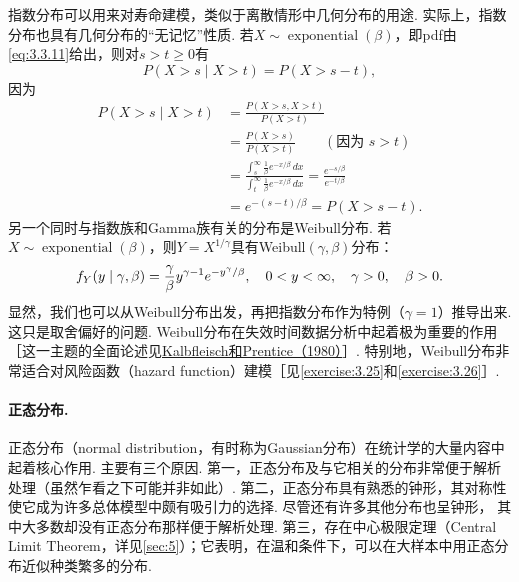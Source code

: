 指数分布可以用来对寿命建模，类似于离散情形中几何分布的用途. 实际上，指数分布也具有几何分布的“无记忆”性质. 若$X\sim\operatorname{exponential}(\beta)$，即pdf由\eqref{eq:3.3.11}给出，则对$s>t\ge0$有
$$P(X>s\mid X>t)=P(X>s-t),$$
因为
\begin{align*}
P(X>s\mid X>t)&=\frac{P(X>s,X>t)}{P(X>t)}\\
&=\frac{P(X>s)}{P(X>t)}\qquad(\text{因为 }s>t)\\
&=\frac{\int_s^\infty\frac1\beta e^{-x/\beta}\,dx}{\int_t^\infty\frac1\beta e^{-x/\beta}\,dx}
=\frac{e^{-s/\beta}}{e^{-t/\beta}}\\
&=e^{-(s-t)/\beta}=P(X>s-t).
\end{align*}
另一个同时与指数族和Gamma族有关的分布是Weibull分布. 若$X\sim\operatorname{exponential}(\beta)$，则$Y=X^{1/\gamma}$具有Weibull$(\gamma,\beta)$分布：
\begin{equation}\label{eq:3.3.12}\index{SI0391@威布尔}
f_Y(y\mid\gamma,\beta)=\frac\gamma\beta y^{\gamma-1}e^{-y^\gamma/\beta},\quad0<y<\infty,\quad\gamma>0,\quad\beta>0.
\end{equation}
显然，我们也可以从Weibull分布出发，再把指数分布作为特例（$\gamma=1$）推导出来. 这只是取舍偏好的问题. Weibull分布在失效时间数据分析中起着极为重要的作用［这一主题的全面论述见\hyperref[bib:source186]{Kalbfleisch和Prentice（1980）}］. 特别地，Weibull分布非常适合对风险函数（hazard function）建模［见\autoref{exercise:3.25}和\autoref{exercise:3.26}］.

\paragraph{正态分布.}
正态分布（normal distribution，有时称为Gaussian分布）在统计学的大量内容中起着核心作用. 主要有三个原因. 第一，正态分布及与它相关的分布非常便于解析处理（虽然乍看之下可能并非如此）. 第二，正态分布具有熟悉的钟形，其对称性使它成为许多总体模型中颇有吸引力的选择. 尽管还有许多其他分布也呈钟形，
其中大多数却没有正态分布那样便于解析处理. 第三，存在中心极限定理（Central Limit Theorem，详见\autoref{sec:5}）；它表明，在温和条件下，可以在大样本中用正态分布近似种类繁多的分布.

